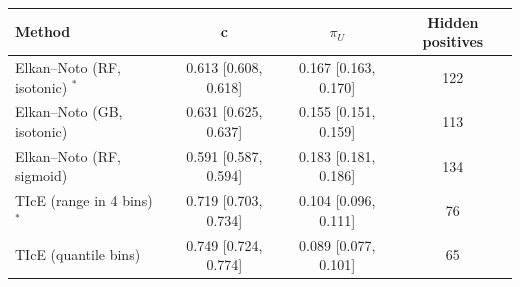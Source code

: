 \begin{tabular}{lccc}
\toprule
Method & c & $\pi_U$ & Hidden positives \\
\midrule
Elkan--Noto (RF, isotonic) $^{*}$ & 0.613 [0.608, 0.618] & 0.167 [0.163, 0.170] & 122 \\
Elkan--Noto (GB, isotonic) & 0.631 [0.625, 0.637] & 0.155 [0.151, 0.159] & 113 \\
Elkan--Noto (RF, sigmoid) & 0.591 [0.587, 0.594] & 0.183 [0.181, 0.186] & 134 \\
TIcE (range in 4 bins) $^{*}$ & 0.719 [0.703, 0.734] & 0.104 [0.096, 0.111] & 76 \\
TIcE (quantile bins) & 0.749 [0.724, 0.774] & 0.089 [0.077, 0.101] & 65 \\
\bottomrule
\end{tabular}
